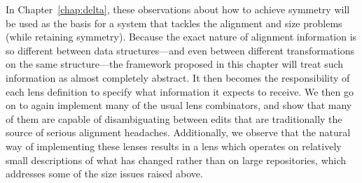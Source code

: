 In Chapter~\ref{chap:delta}, these observations about how to achieve
symmetry will be used as the basis for a system that tackles the alignment
and size problems (while retaining symmetry). Because the exact nature of
alignment information is so different between data structures---and even
between different transformations on the same structure---the framework
proposed in this chapter will treat such information as almost completely
abstract. It then becomes the responsibility of each lens definition to
specify what information it expects to receive. We then go on to again
implement many of the usual lens combinators, and show that many of them are
capable of disambiguating between edits that are traditionally the source of
serious alignment headaches. Additionally, we observe that the natural way
of implementing these lenses results in a lens which operates on relatively
small descriptions of what has changed rather than on large repositories,
which addresses some of the size issues raised above.

